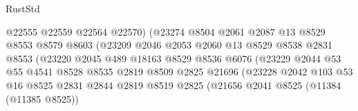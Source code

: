 \begin{lexlean}{RustStd}
\begin{coremodule}
                                      @22555
                                      @22559
                                      @22564
                                      @22570)
                                    (@23274
                                      @8504
                                      @2061
                                      @2087
                                      @13
                                      @8529
                                      @8553
                                      @8579
                                      @8603
                                      (@23209
                                        @2046
                                        @2053
                                        @2060
                                        @13
                                        @8529
                                        @8538
                                        @2831
                                        @8553
                                        (@23220
                                          @2045
                                          @489
                                          @18163
                                          @8529
                                          @8536
                                          @6076
                                          (@23229
                                            @2044
                                            @53
                                            @55
                                            @4541
                                            @8528
                                            @8535
                                            @2819
                                            @8509
                                            @2825
                                            @21696
                                            (@23228
                                              @2042
                                              @103
                                              @53
                                              @16
                                              @8525
                                              @2831
                                              @2844
                                              @2819
                                              @8519
                                              @2825
                                              (@21656
                                                @2041
                                                @8525
                                                (@11384 (@11385 @8525))

\end{coremodule}
\end{lexlean}
